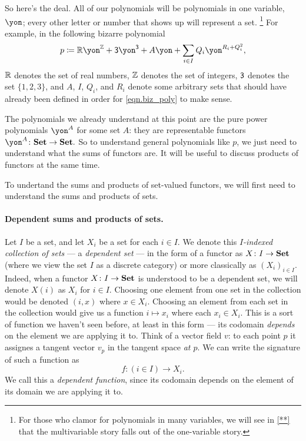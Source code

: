 \documentclass[Book-Poly]{subfiles}
\begin{document}
So here's the deal. All of our polynomials will be polynomials in one variable, $\yon$; every other letter or number that shows up will represent a set.%
\footnote{For those who clamor for polynomials in many variables, we will see in \cref{**} that the multivariable story falls out of the one-variable story.}
For example, in the following bizarre polynomial
\begin{equation}\label{eqn.biz_poly}
p\coloneqq\rr\yon^\zz+\3\yon^{\3}+A\yon+\sum_{i\in I}Q_i\yon^{R_i+Q_i^2},
\end{equation}
$\mathbb{R}$ denotes the set of real numbers, $\mathbb{Z}$ denotes the set of integers, $\textsf{3}$ denotes the set $\{1,2,3\}$, and $A$, $I$, $Q_i$, and $R_i$ denote some arbitrary sets that should have already been defined in order for \eqref{eqn.biz_poly} to make sense.

The polynomials we already understand at this point are the pure power polynomials $\yon^A$ for some set $A$: they are representable functors $\yon^A\colon\smset\to\smset.$
So to understand general polynomials like $p$, we just need to understand what the sums of functors are. It will be useful to discuss products of functors at the same time.

To undertand the sums and products of set-valued functors, we will first need to understand the sums and products of sets.

\paragraph{Dependent sums and products of sets.}

Let $I$ be a set, and let $X_i$ be a set for each $i\in I$. We denote this
\emph{$I$-indexed collection of sets} --- a \emph{dependent set} --- in the form of a functor as $X\colon I\to\textbf{Set}$ (where we view the set $I$ as a discrete category) or more classically as $(X_i)_{i\in I}$.
Indeed, when a functor $X \colon I \to \textbf{Set}$ is understood to be a dependent set, we will denote $X(i)$ as $X_i$ for $i \in I$.
Choosing one element from one set in the collection would be denoted $(i,x)$ where $x\in X_i$. Choosing an element from
each set in the collection would give us a function $i \mapsto x_i$ where each
$x_i\in X_i$. This is a sort of function we haven't seen before, at least in
this form --- its codomain \emph{depends} on the element we are applying it to.
Think of a vector field $v$: to each point $p$ it assignes a tangent vector
$v_p$ in the tangent space \emph{at $p$}. We can write the signature of such a
function as
\[f \colon (i \in I) \to X_i.\]
We call this a \emph{dependent function}, since its codomain depends on the
element of its domain we are applying it to.
\end{document}
